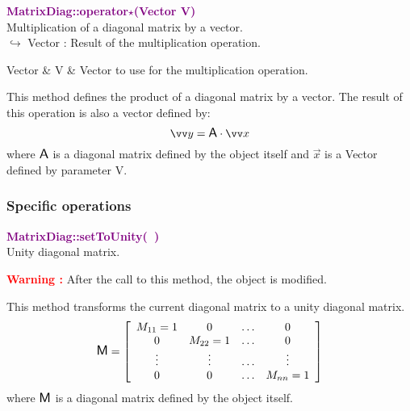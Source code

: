 \textcolor{purple}{\textbf{MatrixDiag::operator$\star$(Vector V)}}\label{MatrixDiag::operator*(Vector V)}\\
Multiplication of a diagonal matrix by a vector.\\ \hspace*{10mm}$\hookrightarrow$ Vector : Result of the multiplication operation.

\begin{tcolorbox}[width=\textwidth,myArgs,tabularx={ll|R}]
Vector & V & Vector to use for the multiplication operation.
\end{tcolorbox}

This method defines the product of a diagonal matrix by a vector.
The result of this operation is also a vector defined by:
\begin{equation*}
\overrightarrow{y} = \A \cdot \overrightarrow{x}
\end{equation*}
where $\mbox{\large\ensuremath{\mathsf{A}}}$ is a diagonal matrix defined by the object itself and $\overrightarrow{x}$ is a Vector defined by parameter V.

\subsubsection{Specific operations}

\textcolor{purple}{\textbf{MatrixDiag::setToUnity(~)}}\label{MatrixDiag::setToUnity()}\\
Unity diagonal matrix.

\hspace*{10mm}\textcolor{red}{\textbf{Warning :}} After the call to this method, the object is modified.

This method transforms the current diagonal matrix to a unity diagonal matrix.
\begin{equation*}
\mbox{\large\ensuremath{\mathsf{M}}}=\left[\begin{array}{cccc}
  M_{11}=1 & 0 & \hdots & 0\\
  0 & M_{22}=1 & \hdots & 0\\
  \vdots & \vdots & \hdots & \vdots\\
  0 & 0 & \hdots & M_{nn}=1
  \end{array}\right]
\end{equation*}
where $\mbox{\large\ensuremath{\mathsf{M}}}$ is a diagonal matrix defined by the object itself.

